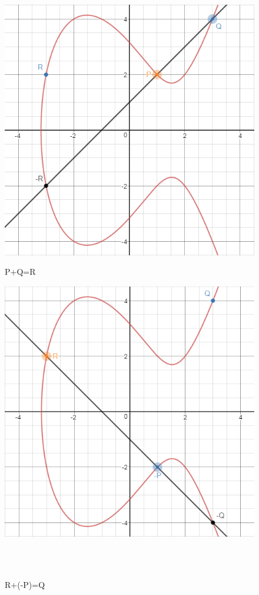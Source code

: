 \documentclass[a4paper,12pt]{tesiinfo}
\begin{document}
\begin{figure}[H]
 \begin{minipage}[H]{0.5\textwidth}
  \includegraphics[width=\textwidth, left]{PQR+}
  \caption{P+Q=R}
  \label{PQR+}
 \end{minipage}
 \begin{minipage}[H]{0.5\textwidth}
  \includegraphics[width=\textwidth, right]{PQR-}
  \caption{R+(-P)=Q}
  \label{PQR-}
 \end{minipage}
 \\
 \\
\end{figure}
\end{document}
